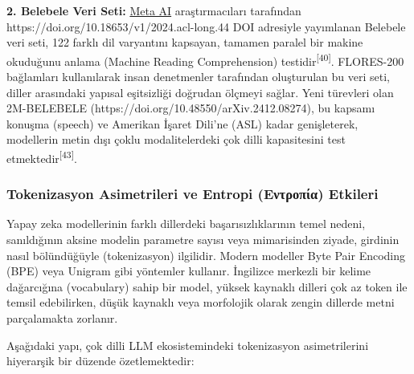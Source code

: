 \documentclass[11pt,a4paper]{article}
\begin{document}
\textbf{2. Belebele Veri Seti:} \href{https://ai.meta.com/}{Meta AI} araştırmacıları tarafından https://doi.org/10.18653/v1/2024.acl-long.44 DOI adresiyle yayımlanan Belebele veri seti, 122 farklı dil varyantını kapsayan, tamamen paralel bir makine okuduğunu anlama (Machine Reading Comprehension) testidir\textsuperscript{[40]}. FLORES-200 bağlamları kullanılarak insan denetmenler tarafından oluşturulan bu veri seti, diller arasındaki yapısal eşitsizliği doğrudan ölçmeyi sağlar. Yeni türevleri olan 2M-BELEBELE (https://doi.org/10.48550/arXiv.2412.08274), bu kapsamı konuşma (speech) ve Amerikan İşaret Dili'ne (ASL) kadar genişleterek, modellerin metin dışı çoklu modalitelerdeki çok dilli kapasitesini test etmektedir\textsuperscript{[43]}.

\subsubsection{Tokenizasyon Asimetrileri ve Entropi (Εντροπία) Etkileri}
Yapay zeka modellerinin farklı dillerdeki başarısızlıklarının temel nedeni, sanıldığının aksine modelin parametre sayısı veya mimarisinden ziyade, girdinin nasıl bölündüğüyle (tokenizasyon) ilgilidir. Modern modeller Byte Pair Encoding (BPE) veya Unigram gibi yöntemler kullanır. İngilizce merkezli bir kelime dağarcığına (vocabulary) sahip bir model, yüksek kaynaklı dilleri çok az token ile temsil edebilirken, düşük kaynaklı veya morfolojik olarak zengin dillerde metni parçalamakta zorlanır.

Aşağıdaki yapı, çok dilli LLM ekosistemindeki tokenizasyon asimetrilerini hiyerarşik bir düzende özetlemektedir:
\end{document}
